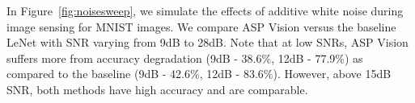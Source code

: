 \documentclass[10pt,twocolumn,letterpaper]{article}
\begin{document}
In Figure~\ref{fig:noisesweep}, we simulate the effects of additive white noise during image sensing for MNIST images. We compare ASP Vision versus the baseline LeNet with SNR varying from 9dB to 28dB. Note that at low SNRs, ASP Vision suffers more from accuracy degradation (9dB - 38.6\%, 12dB - 77.9\%) as compared to the baseline (9dB - 42.6\%, 12dB - 83.6\%). However, above 15dB SNR, both methods have high accuracy and are comparable. 
\end{document}

